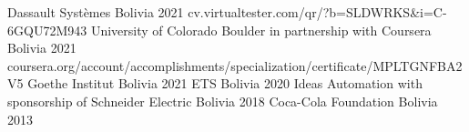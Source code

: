 

\begin{cvhonors}
    {Dassault Syst\`emes}
    {Bolivia}
    {2021}
    {cv.virtualtester.com/qr/?b=SLDWRKS\&i=C-6GQU72M943}
    {University of Colorado Boulder in partnership with Coursera}
    {Bolivia}
    {2021}
    {coursera.org/account/accomplishments/specialization/certificate/MPLTGNFBA2V5}
    {Goethe Institut}
    {Bolivia}
    {2021}
    {}
    {ETS}
    {Bolivia}
    {2020}
    {}
    {Ideas Automation with sponsorship of Schneider Electric}
    {Bolivia}
    {2018}
    {}
    {Coca-Cola Foundation}
    {Bolivia}
    {2013}
    {}
\end{cvhonors}
